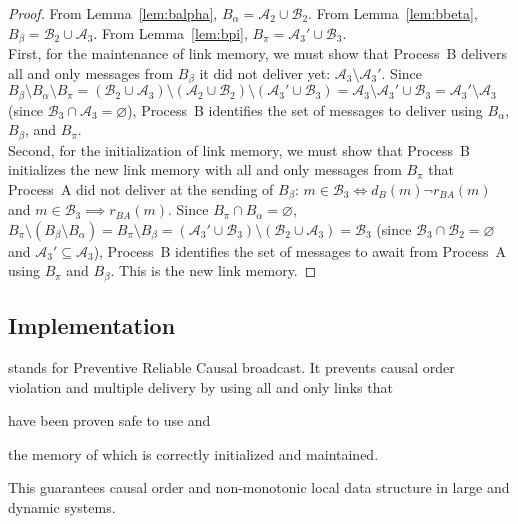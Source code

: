 \begin{proof}
  From Lemma~\ref{lem:balpha}, $B_\alpha = \mathcal{A}_2 \cup \mathcal{B}_2$.
  From Lemma~\ref{lem:bbeta}, $B_\beta= \mathcal{B}_2 \cup \mathcal{A}_3$. From
  Lemma~\ref{lem:bpi}, $B_\pi = \mathcal{A}_3' \cup \mathcal{B}_3$. \\ First,
  for the maintenance of link memory, we must show that Process~B delivers all
  and only messages from $B_\beta$ it did not deliver yet:
  $\mathcal{A}_3 \setminus \mathcal{A}_3'$. Since
  $B_\beta \setminus B_\alpha \setminus B_\pi = (\mathcal{B}_2 \cup
  \mathcal{A}_3) \setminus (\mathcal{A}_2 \cup \mathcal{B}_2) \setminus
  (\mathcal{A}_3' \cup \mathcal{B}_3) = \mathcal{A}_3 \setminus \mathcal{A}_3'
  \cup \mathcal{B}_3 = \mathcal{A}_3'\setminus \mathcal{A}_3$
  (since $\mathcal{B}_3 \cap \mathcal{A}_3 = \varnothing$), Process~B identifies
  the set of messages to deliver using $B_\alpha$, $B_\beta$, and $B_\pi$. \\
  Second, for the initialization of link memory, we must show that Process~B
  initializes the new link memory with all and only messages from $B_\pi$ that
  Process~A did not deliver at the sending of $B_\beta$:
  $m \in \mathcal{B}_3 \Leftrightarrow d_B(m) \neg r_{BA}(m)$ and
  $m \in \mathcal{B}_3 \implies r_{BA}(m)$.  Since
  $B_\pi \cap B_\alpha = \varnothing$,
  $B_\pi \setminus (B_\beta \setminus B_\alpha)= B_\pi \setminus B_\beta =
  (\mathcal{A}_3' \cup \mathcal{B}_3) \setminus (\mathcal{B}_2 \cup
  \mathcal{A}_3) = \mathcal{B}_3$
  (since $\mathcal{B}_3 \cap \mathcal{B}_2 = \varnothing$ and
  $\mathcal{A}_3' \subseteq \mathcal{A}_3$), Process~B identifies the set of
  messages to await from Process~A using $B_\pi$ and $B_\beta$. This is the new
  link memory.
\end{proof}

\subsection{Implementation}

\RPCBROADCAST stands for Preventive Reliable Causal broadcast. It prevents
causal order violation and multiple delivery by using all and only links that
\begin{inparaenum}[(i)]
\item have been proven safe to use and
\item the memory of which is correctly initialized and maintained.
\end{inparaenum}
This guarantees causal order and non-monotonic local data structure in large and
dynamic systems. 

